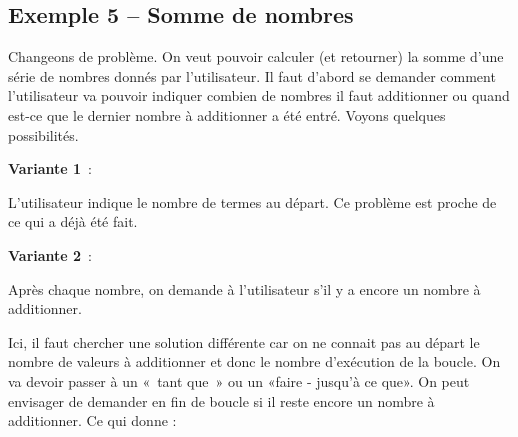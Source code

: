 
	\subsection{Exemple 5 -- Somme de nombres}

		Changeons de problème. On veut pouvoir calculer (et retourner)
		la somme d'une série de nombres donnés par
		l'utilisateur. Il faut d'abord se
		demander comment l'utilisateur va pouvoir indiquer
		combien de nombres il faut additionner ou quand est-ce que le dernier
		nombre à additionner a été entré. Voyons quelques possibilités.

		\textbf{Variante 1}~: 
		
		L'utilisateur indique le nombre de termes au départ.
		Ce problème est proche de ce qui a déjà été fait.
		

		\textbf{Variante 2}~: 
		
		Après chaque nombre, 
		on demande à l'utilisateur s'il y a encore un nombre à additionner.

		Ici, il faut chercher une solution différente
		car on ne connait pas au départ le nombre de valeurs à additionner et
		donc le nombre d'exécution de la boucle. On va devoir passer à un
		«~tant que~» ou un «faire - jusqu'à ce que». On peut
		envisager de demander en fin de boucle si il reste
		encore un nombre à additionner. Ce qui donne :

		
